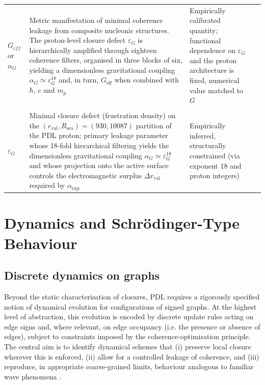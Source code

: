 \documentclass[11pt,a4paper]{article}
\begin{document}
\begin{longtable}{@{}L{1.5cm}L{7.3cm}L{4.2cm}p{1.8cm}@{}}
  $G_{eff}$ or $\alpha_G$ & 
  Metric manifestation of minimal coherence leakage from composite nucleonic structures. The proton-level closure defect $\varepsilon_G$ is hierarchically amplified through eighteen coherence filters, organised in three blocks of six, yielding a dimensionless gravitational coupling $\alpha_G \simeq \varepsilon_G^{18}$ and, in turn, $G_{\text{eff}}$ when combined with $\hbar$, $c$ and $m_p$ & Empirically calibrated quantity; functional dependence on $\varepsilon_G$ and the proton architecture is fixed, numerical value matched to $G$ 
  & \cite{Exponent_18_PDL_2026,Topological_Reformulation_PDL_2026,Universal_Coherence_Leakage_V3_2026} \\\\[0.4em]

  $\varepsilon_G$ & 
  Minimal closure defect (frustration density) on the $(r_{\text{val}},R_{\text{sea}})=(930,10087)$ partition of the PDL proton; primary leakage parameter whose 18-fold hierarchical filtering yields the dimensionless gravitational coupling $\alpha_G \simeq \varepsilon_G^{18}$ and whose projection onto the active surface controls the electromagnetic surplus $\Delta r_{\text{val}}$ required by $\alpha_{\text{exp}}$ & Empirically inferred, structurally constrained (via exponent 18 and proton integers) & 
  \cite{Exponent_18_PDL_2026,Topological_Reformulation_PDL_2026,Universal_Coherence_Leakage_V3_2026} \\[0.4em]

\end{longtable}

\section{Dynamics and Schr\"odinger-Type Behaviour}
\label{sec:dynamics}

\subsection{Discrete dynamics on graphs}
\label{subsec:discrete_dynamics}

Beyond the static characterisation of closures, PDL requires a rigorously specified notion of dynamical evolution for configurations of signed graphs. At the highest level of abstraction, this evolution is encoded by discrete update rules acting on edge signs and, where relevant, on edge occupancy (i.e. the presence or absence of edges), subject to constraints imposed by the coherence‑optimisation principle. The central aim is to identify dynamical schemes that (i) preserve local closure wherever this is enforced, (ii) allow for a controlled leakage of coherence, and (iii) reproduce, in appropriate coarse‑grained limits, behaviour analogous to familiar wave phenomena \citep{PDL_Main_2026,PDL_position}.
\end{document}
